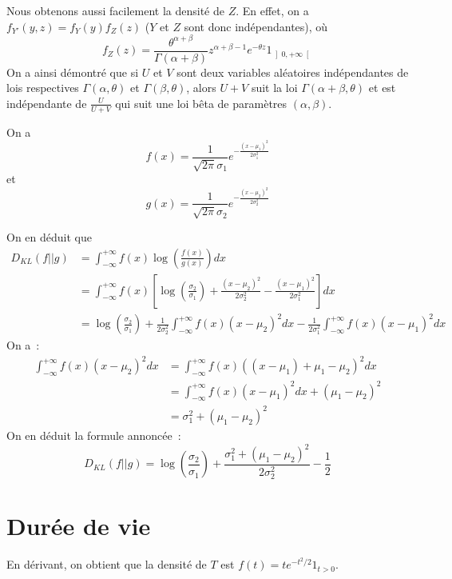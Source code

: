 Nous obtenons aussi facilement la densité de \(Z\). En effet, on a
\(f_{Y'}(y,z) = f_Y(y)f_Z(z)\) (\(Y\) et \(Z\) sont donc indépendantes),
où
\[f_Z(z) = \frac{\theta^{\alpha+\beta}}{\Gamma(\alpha+\beta)}z^{\alpha+\beta -1}e^{-\theta z}1_{\left]0,+\infty\right[}\]
On a ainsi démontré que si \(U\) et \(V\) sont deux variables aléatoires
indépendantes de lois respectives \(\Gamma(\alpha,\theta)\) et
\(\Gamma(\beta,\theta)\), alors \(U+V\) suit la loi
\(\Gamma(\alpha+\beta,\theta)\) et est indépendante de \(\frac{U}{U+V}\)
qui suit une loi bêta de paramètres \((\alpha,\beta)\).

\label{II-answer-exoklgauss}
On a
\[f(x) = \frac{1}{\sqrt{2\pi}\sigma_1} e^{-\frac{(x-\mu_1)^2}{2\sigma_1^2}}\]
et
\[g(x) = \frac{1}{\sqrt{2\pi}\sigma_2} e^{-\frac{(x-\mu_2)^2}{2\sigma_2^2}}\]

On en déduit que \begin{align*}
D_{KL} (f || g) &= \int_{-\infty}^{+\infty} f(x) \log \left(\frac{f(x)}{g(x)}\right) dx \\
                &= \int_{-\infty}^{+\infty} f(x) \left[ \log \left(\frac{\sigma_2}{\sigma_1}\right) + \frac{(x-\mu_2)^2}{2\sigma_2^2} - \frac{(x-\mu_1)^2}{2\sigma_1^2} \right] dx \\
                &= \log \left(\frac{\sigma_2}{\sigma_1}\right) + \frac{1}{2\sigma_2^2} \int_{-\infty}^{+\infty} f(x) (x-\mu_2)^2 dx - \frac{1}{2\sigma_1^2} \int_{-\infty}^{+\infty} f(x) (x-\mu_1)^2 dx
\end{align*} On a~: \begin{align*}
\int_{-\infty}^{+\infty} f(x) (x-\mu_2)^2 dx &= \int_{-\infty}^{+\infty} f(x) ((x-\mu_1)+\mu_1-\mu_2)^2 dx \\
&= \int_{-\infty}^{+\infty} f(x) (x-\mu_1)^2 dx + (\mu_1 - \mu_2)^2 \\
&= \sigma_1^2 + (\mu_1 - \mu_2)^2 
\end{align*} On en déduit la formule annoncée~:
\[D_{KL} (f || g) = \log \left(\frac{\sigma_2}{\sigma_1}\right) + \frac{\sigma_1^2 + (\mu_1 - \mu_2)^2}{2\sigma_2^2} - \frac{1}{2}\]

\section{Durée de vie}\label{II-duruxe9e-de-vie-1}

\label{II-answer-dureevie1}
En dérivant, on obtient que la densité de \(T\) est
\(f(t) = t e^{-t^2/2}1_{t>0}\).

